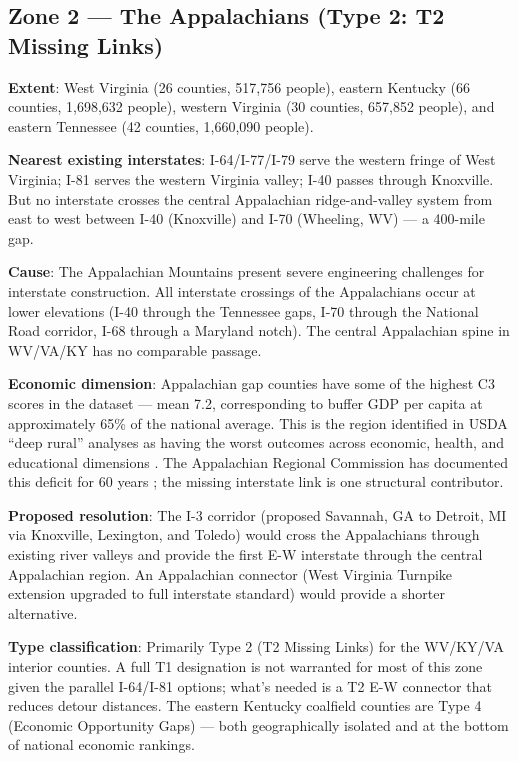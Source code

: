 \subsection{Zone 2 — The Appalachians (Type 2: T2 Missing Links)}

\textbf{Extent}: West Virginia (26 counties, 517,756 people), eastern Kentucky (66 counties, 1,698,632 people), western Virginia (30 counties, 657,852 people), and eastern Tennessee (42 counties, 1,660,090 people).

\textbf{Nearest existing interstates}: I-64/I-77/I-79 serve the western fringe of West Virginia; I-81 serves the western Virginia valley; I-40 passes through Knoxville. But no interstate crosses the central Appalachian ridge-and-valley system from east to west between I-40 (Knoxville) and I-70 (Wheeling, WV) --- a 400-mile gap.

\textbf{Cause}: The Appalachian Mountains present severe engineering challenges for interstate construction. All interstate crossings of the Appalachians occur at lower elevations (I-40 through the Tennessee gaps, I-70 through the National Road corridor, I-68 through a Maryland notch). The central Appalachian spine in WV/VA/KY has no comparable passage.

\textbf{Economic dimension}: Appalachian gap counties have some of the highest C3 scores in the dataset --- mean 7.2, corresponding to buffer GDP per capita at approximately 65\% of the national average. This is the region identified in USDA ``deep rural'' analyses as having the worst outcomes across economic, health, and educational dimensions \citep{USDA_ERS2020}. The Appalachian Regional Commission has documented this deficit for 60 years \citep{ARC2023}; the missing interstate link is one structural contributor.

\textbf{Proposed resolution}: The I-3 corridor (proposed Savannah, GA to Detroit, MI via Knoxville, Lexington, and Toledo) would cross the Appalachians through existing river valleys and provide the first E-W interstate through the central Appalachian region. An Appalachian connector (West Virginia Turnpike extension upgraded to full interstate standard) would provide a shorter alternative.

\textbf{Type classification}: Primarily Type 2 (T2 Missing Links) for the WV/KY/VA interior counties. A full T1 designation is not warranted for most of this zone given the parallel I-64/I-81 options; what's needed is a T2 E-W connector that reduces detour distances. The eastern Kentucky coalfield counties are Type 4 (Economic Opportunity Gaps) --- both geographically isolated and at the bottom of national economic rankings.

